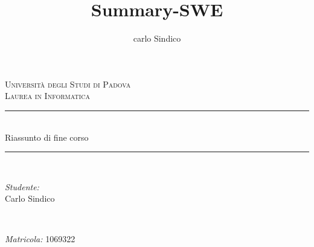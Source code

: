 \documentclass[a4paper,10pt] {article}
\title{Summary-SWE}
\author{carlo Sindico}
\begin{document}



\begin{titlepage}

\newcommand{\HRule}{\rule{\linewidth}{0.5mm}} %


\center %
 

\textsc{\LARGE Universit\`a degli Studi di Padova}\\[1.5cm] %

\textsc{\Large Laurea in Informatica}\\[0.5cm] %



\HRule \\[0.4cm]
{ \huge  Riassunto di fine corso}\\[0.3cm] %
\HRule \\[1.5cm]
 

\begin{minipage}{0.4\textwidth}
\begin{flushleft} \large
\emph{Studente:}\\
Carlo Sindico%
\end{flushleft}
\end{minipage}
~
\begin{minipage}{0.4\textwidth}
\begin{flushright} \large
\emph{Matricola:}
\textsc{1069322} %
\end{flushright}
\end{minipage}\\[4cm]



\end{titlepage}
\end{document}
